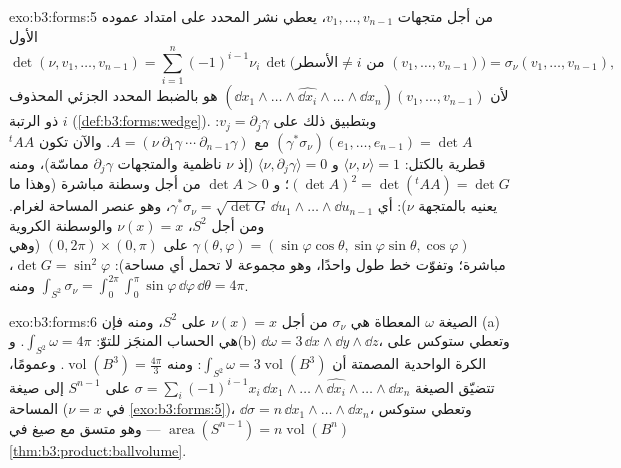 \begin{solution}{exo:b3:forms:5}
من أجل متجهات $v_1, \dots, v_{n-1}$، يعطي نشر المحدد على امتداد عموده الأول
\[
\det(\nu, v_1, \dots, v_{n-1}) =
\sum_{i=1}^n(-1)^{i-1}\nu_i\,
\det\bigl(\text{الأسطر} \neq i \text{ من } (v_1, \dots,
v_{n-1})\bigr)
= \sigma_\nu(v_1, \dots, v_{n-1}),
\]
لأن $(\dd x_1\wedge\dots\wedge\widehat{\dd
x_i}\wedge\dots\wedge\dd x_n)(v_1, \dots, v_{n-1})$ هو بالضبط المحدد الجزئي المحذوف ذو الرتبة $i$
(\cref{def:b3:forms:wedge}). وبتطبيق ذلك على $v_j =
\partial_j\gamma$: $(\gamma^*\sigma_\nu)(e_1, \dots,
e_{n-1}) = \det A$ مع $A = (\nu\ \partial_1\gamma\ \cdots\
\partial_{n-1}\gamma)$. والآن
تكون ${}^t\!AA$ قطرية بالكتل: $\langle\nu, \nu\rangle = 1$ و $\langle\nu,
\partial_j\gamma\rangle = 0$ (إذ $\nu$ ناظمية
والمتجهات $\partial_j\gamma$ مماسّة)، ومنه $(\det A)^2 =
\det({}^t\!AA) = \det G$؛ و $\det A > 0$ من أجل
وسطنة مباشرة (وهذا ما يعنيه  بالمتجهة $\nu$): أي $\gamma^*\sigma_\nu = \sqrt{\det G}\,\dd
u_1\wedge\dots\wedge\dd u_{n-1}$،
وهو عنصر المساحة لغرام. ومن أجل $S^2$، $\nu(x) = x$ والوسطنة
الكروية $\gamma(\theta, \varphi) = (\sin\varphi\cos\theta,
\sin\varphi\sin\theta, \cos\varphi)$ على $(0,2\pi)\times(0,\pi)$ (وهي مباشرة؛ وتفوّت خط طول واحدًا،
وهو مجموعة لا تحمل أي مساحة): $\det G = \sin^2\varphi$، ومنه $\int_{S^2}\sigma_\nu =
\int_0^{2\pi}\!\!\int_0^\pi\sin\varphi\,\dd\varphi\,
\dd\theta = 4\pi$.
\end{solution}

\begin{solution}{exo:b3:forms:6}
الصيغة $\omega$ المعطاة هي $\sigma_\nu$ من أجل $\nu(x) = x$ على
$S^2$، ومنه فإن (a) هي الحساب المنجَز للتوّ: $\int_{S^2}\omega = 4\pi$. و(b)
$\dd\omega = 3\,\dd
x\wedge\dd y\wedge\dd z$، وتعطي ستوكس على الكرة الواحدية المصمتة أن $\int_{S^2}\omega = 3\operatorname{vol}(B^3)$: ومنه
$\operatorname{vol}(B^3) = \frac{4\pi}3$. وعمومًا، تتضيّق الصيغة $\sigma = \sum_i(-1)^{i-1}x_i\,\dd
x_1\wedge\dots\wedge\widehat{\dd x_i}\wedge\dots\wedge\dd
x_n$ على $S^{n-1}$ إلى صيغة
المساحة ($\nu = x$ في \cref{exo:b3:forms:5})، $\dd\sigma = n\,\dd
x_1\wedge\dots\wedge\dd x_n$، وتعطي ستوكس
$\operatorname{area}(S^{n-1}) = n\operatorname{vol}(B^n)$
--- وهو متسق مع صيغ  في \cref{thm:b3:product:ballvolume}.
\end{solution}

